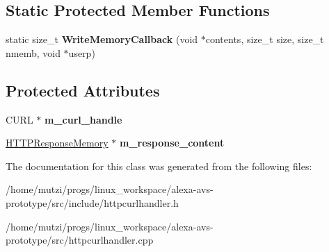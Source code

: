 \subsection*{Static Protected Member Functions}
\begin{DoxyCompactItemize}
\item 
\mbox{\label{classNetwork_1_1HTTP_1_1HTTPCurlHandler_a1d4b5817614cf5e07e7da42cb9f6ab3e}} 
static size\+\_\+t {\bfseries Write\+Memory\+Callback} (void $\ast$contents, size\+\_\+t size, size\+\_\+t nmemb, void $\ast$userp)
\end{DoxyCompactItemize}
\subsection*{Protected Attributes}
\begin{DoxyCompactItemize}
\item 
\mbox{\label{classNetwork_1_1HTTP_1_1HTTPCurlHandler_a87da1d90cd40c6ed90e97fd74698a6b4}} 
C\+U\+RL $\ast$ {\bfseries m\+\_\+curl\+\_\+handle}
\item 
\mbox{\label{classNetwork_1_1HTTP_1_1HTTPCurlHandler_a338d584b47b509d09059ed64bb79b7af}} 
\hyperlink{structNetwork_1_1HTTP_1_1HTTPResponseMemory}{H\+T\+T\+P\+Response\+Memory} $\ast$ {\bfseries m\+\_\+response\+\_\+content}
\end{DoxyCompactItemize}


The documentation for this class was generated from the following files\+:\begin{DoxyCompactItemize}
\item 
/home/mutzi/progs/linux\+\_\+workspace/alexa-\/avs-\/prototype/src/include/httpcurlhandler.\+h\item 
/home/mutzi/progs/linux\+\_\+workspace/alexa-\/avs-\/prototype/src/httpcurlhandler.\+cpp\end{DoxyCompactItemize}
